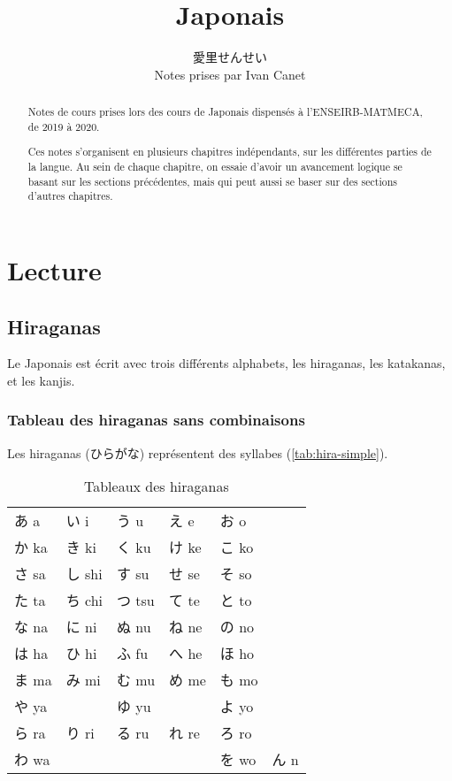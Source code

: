 \documentclass[a4paper,10pt,french,openany]{memoir}
\title{Japonais}
\author{愛里せんせい\\Notes prises par Ivan Canet}
\begin{document}
\maketitle

\begin{abstract}
 Notes de cours prises lors des cours de Japonais dispensés à l'ENSEIRB-MATMECA, de 2019 à 2020.
 
 Ces notes s'organisent en plusieurs chapitres indépendants, sur les différentes parties de la langue.
 Au sein de chaque chapitre, on essaie d'avoir un avancement logique se basant sur les sections précédentes, mais qui peut aussi se baser sur des sections d'autres chapitres.
\end{abstract}


\tableofcontents

\chapter{Lecture}
\section{Hiraganas}

Le Japonais est écrit avec trois différents alphabets, les hiraganas, les katakanas, et les kanjis.

\subsection{Tableau des hiraganas sans combinaisons}

Les hiraganas (ひらがな) représentent des syllabes (\autoref{tab:hira-simple}).

\begin{table}[htbp]
 \centering
 \caption{Tableaux des hiraganas}
 \label{tab:hira-simple}
 \begin{tabular}{llllll}
  あ a  & い i  & う u  & え e  & お o  &\\
  か ka & き ki & く ku & け ke & こ ko &\\
  さ sa & し shi& す su & せ se & そ so &\\
  た ta & ち chi& つ tsu& て te & と to &\\
  な na & に ni & ぬ nu & ね ne & の no &\\
  は ha & ひ hi & ふ fu & へ he & ほ ho &\\
  ま ma & み mi & む mu & め me & も mo &\\
  や ya & 　    & ゆ yu &　     & よ yo &\\
  ら ra & り ri & る ru & れ re & ろ ro &\\
  わ wa & 　    & 　    & 　    & を wo & ん n\\
 \end{tabular}
\end{table}
\end{document}
